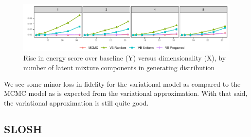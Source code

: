     \begin{figure}[ht]
        \centering
        \caption{Rise in energy score over baseline (Y) versus dimensionality (X), 
            by number of latent mixture components in generating distribution
            \label{fig:energyscore}}
        \includegraphics{./plots/energy_score}
    \end{figure}
    
    We see some minor loss in fidelity for the variational model as compared to 
    the MCMC model as is expected from the variational approximation.  With that
    said, the variational approximation is still quite good.

\subsection{SLOSH}






    

